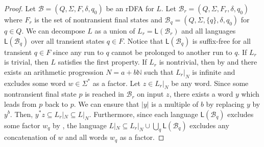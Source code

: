 \documentclass{theoretics}
\newcommand{\N}{\mathbb{N}}
\newcommand{\B}{\mathcal{B}}
\renewcommand{\L}{\mathsf{L}}
\begin{document}
\begin{proof}
	Let $\B = (Q,\Sigma,F,\delta,q_0)$ be an rDFA for $L$.
	Let $\B_r = (Q,\Sigma,F_r,\delta,q_0)$ where $F_r$ is the set of nontransient final states
	and $\B_q = (Q,\Sigma,\{q\},\delta,q_0)$ for $q \in Q$.
	We can decompose $L$ as a union of $L_r = \L(\B_r)$ and all languages $\L(\B_q)$
	over all transient states $q \in F$.
	Notice that $\L(\B_q)$ is suffix-free for all transient $q \in F$
	since any run to $q$ cannot be prolonged to another run to $q$.
	If $L_r$ is trivial, then $L$ satisfies the first property.
	If $L_r$ is nontrivial, then by  and 
	there exists an arithmetic progression $N = a + b\N$ such that
	$L_r|_N$ is infinite and excludes some word $w \in \Sigma^*$ as a factor.
	Let $z \in L_r|_N$ be any word. Since some nontransient final state $p$
	is reached in $\B_r$ on input $z$,
	there exists a word $y$ which leads from $p$ back to $p$.
	We can ensure that $|y|$ is a multiple of $b$ by replacing $y$ by $y^b$.
	Then, $y^*z \subseteq L_r|_N \subseteq L|_N$.
	Furthermore, since each language $\L(\B_q)$ excludes some factor $w_q$ by ,
	the language $L|_N \subseteq L_r|_N \cup \bigcup_q \L(\B_q)$
	excludes any concatenation of $w$ and all words $w_q$ as a factor.
\end{proof}
\end{document}
